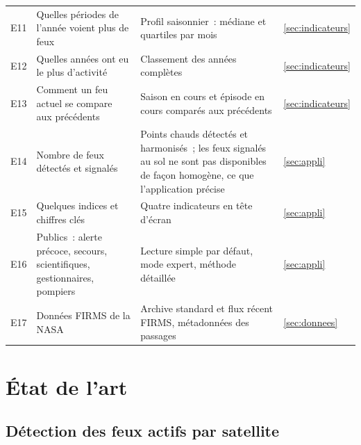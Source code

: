 \documentclass[11pt,a4paper]{article}
\begin{document}
\begin{longtable}{>{\raggedright\arraybackslash}p{0.8cm} >{\raggedright\arraybackslash}p{5.2cm} >{\raggedright\arraybackslash}p{6.6cm} >{\raggedright\arraybackslash}p{1.4cm}}
\small E11 & \small Quelles périodes de l'année voient plus de feux & \small Profil saisonnier~: médiane et quartiles par mois & \small \ref{sec:indicateurs} \\
\small E12 & \small Quelles années ont eu le plus d'activité & \small Classement des années complètes & \small \ref{sec:indicateurs} \\
\small E13 & \small Comment un feu actuel se compare aux précédents & \small Saison en cours et épisode en cours comparés aux précédents & \small \ref{sec:indicateurs} \\
\small E14 & \small Nombre de feux détectés et signalés & \small Points chauds détectés et harmonisés~; les feux signalés au sol ne sont pas disponibles de façon homogène, ce que l'application précise & \small \ref{sec:appli} \\
\small E15 & \small Quelques indices et chiffres clés & \small Quatre indicateurs en tête d'écran & \small \ref{sec:appli} \\
\small E16 & \small Publics~: alerte précoce, secours, scientifiques, gestionnaires, pompiers & \small Lecture simple par défaut, mode expert, méthode détaillée & \small \ref{sec:appli} \\
\small E17 & \small Données FIRMS de la NASA & \small Archive standard et flux récent FIRMS, métadonnées des passages & \small \ref{sec:donnees} \\
\bottomrule
\end{longtable}

\section{État de l'art}\label{sec:etat}

\subsection{Détection des feux actifs par satellite}
\end{document}

